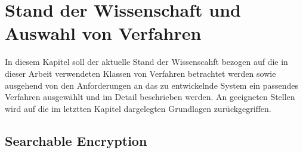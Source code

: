 \chapter{Stand der Wissenschaft und Auswahl von Verfahren}

In diesem Kapitel soll der aktuelle Stand der Wissenscahft bezogen auf die in dieser Arbeit verwendeten Klassen von Verfahren betrachtet werden sowie ausgehend von den Anforderungen an das zu entwickelnde System ein passendes Verfahren ausgewählt und im Detail beschrieben werden. An geeigneten Stellen wird auf die im letztten Kapitel dargelegten Grundlagen zurückgegriffen.

\label{cha_state}







\section{Searchable Encryption}

